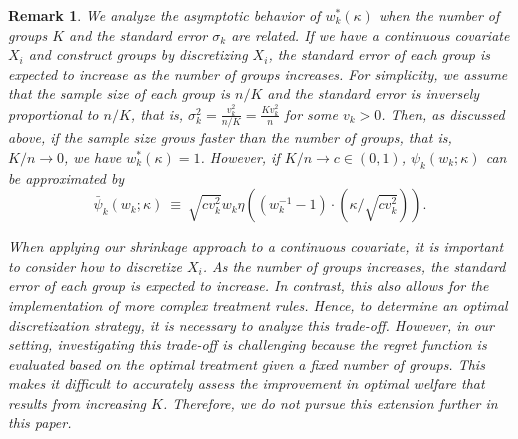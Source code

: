 \documentclass[12pt,a4paper]{article}
\newtheorem{Remark}{Remark}
\begin{document}
\begin{Remark}\label{rem:continuous_case}
We analyze the asymptotic behavior of $w^{\ast}_k (\kappa)$ when the number of groups $K$ and the standard error $\sigma_k$ are related. If we have a continuous covariate $X_i$ and construct groups by discretizing $X_i$, the standard error of each group is expected to increase as the number of groups increases. For simplicity, we assume that the sample size of each group is $n/K$ and the standard error is inversely proportional to $n/K$, that is, $\sigma_k^2 = \frac{v_k^2}{n/K} = \frac{K v_k^2}{n}$ for some $v_k > 0$. Then, as discussed above, if the sample size grows faster than the number of groups, that is, $K/n \to 0$, we have $w_k^{\ast}(\kappa) = 1$. However, if $K/n \to c \in (0,1)$, $\psi_k(w_k;\kappa)$ can be approximated by
\[
\bar{\psi}_k(w_k;\kappa) \ \equiv \ \sqrt{c v_k^2} w_k \eta \left( (w_k^{-1} - 1) \cdot \left( \kappa /  \sqrt{c v_k^2} \right) \right).
\]

When applying our shrinkage approach to a continuous covariate, it is important to consider how to discretize $X_i$. As the number of groups increases, the standard error of each group is expected to increase. In contrast, this also allows for the implementation of more complex treatment rules. Hence, to determine an optimal discretization strategy, it is necessary to analyze this trade-off. However, in our setting, investigating this trade-off is challenging because the regret function is evaluated based on the optimal treatment given a fixed number of groups. This makes it difficult to accurately assess the improvement in optimal welfare that results from increasing $K$. Therefore, we do not pursue this extension further in this paper.
\end{Remark}


\end{document}

